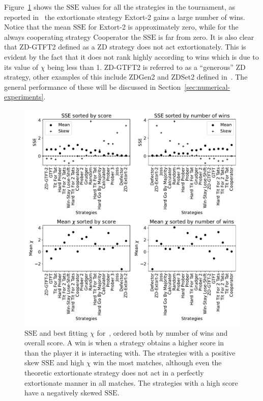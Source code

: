 \documentclass[a4paper]{article}
\newcommand{\SSe}{\text{SSE}}
\begin{document}
Figure~\ref{fig:sserror_in_stewart_plotkin} shows the
\(\SSe\) values for all the strategies in the tournament, as
reported in~\cite{Stewart2012} the extortionate strategy Extort-2 gains a large number of
wins. Notice that the mean \(\SSe\) for Extort-2 is approximately zero, while for
the always cooperating strategy Cooperator the \(\SSe\) is far from zero. It is
also clear that ZD-GTFT2 defined as a ZD strategy does not act
extortionately. This is evident by the fact that it does not rank highly according
to wins which is due to its value of \(\chi\) being less than 1.
ZD-GTFT2 is referred to as a ``generous'' ZD strategy, other examples of this
include ZDGen2 and ZDSet2 defined in~\cite{sep-prisoner-dilemma}. The
general performance of these will be discussed in
Section~\ref{sec:numerical-experiments}.

\begin{figure}[!htbp]
    \centering
    \includegraphics[width=.8\textwidth]{./assets/img/sserror_in_stewart_plotkin/main.pdf}
    \caption{\(\SSe\) and best fitting \(\chi\) for~\cite{Stewart2012},
        ordered both by number of wins and overall score.
        A win is when a strategy obtains a higher score in than the player it is
        interacting with.
        The strategies with a positive skew
        \(\SSe\) and high \(\chi\) win the most matches, although even the
        theoretic
        extortionate strategy does not act in a perfectly extortionate manner in
        all matches. The strategies with a high score have a negatively skewed
        \(\SSe\).
        }
    \label{fig:sserror_in_stewart_plotkin}
\end{figure}
\end{document}
